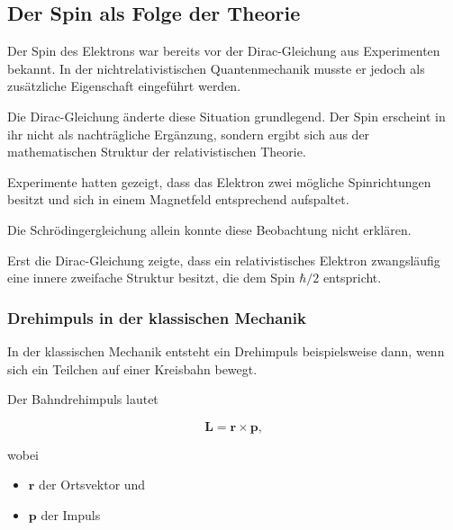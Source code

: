 
\subsection{Der Spin als Folge der Theorie}
\label{subsec:spin_als_folge_der_theorie}

Der Spin des Elektrons war
bereits vor der Dirac-Gleichung aus Experimenten bekannt. In der
nichtrelativistischen Quantenmechanik musste er jedoch als zusätzliche
Eigenschaft eingeführt werden.

Die Dirac-Gleichung änderte diese Situation grundlegend. Der Spin
erscheint in ihr nicht als nachträgliche Ergänzung, sondern ergibt sich
aus der mathematischen Struktur der relativistischen Theorie.

\begin{HistoryBox}
	\label{box:spin_vom_experiment_zur_theorie}
	
	Experimente hatten gezeigt, dass das Elektron zwei mögliche
	Spinrichtungen besitzt und sich in einem Magnetfeld entsprechend
	aufspaltet.
	
	Die Schrödingergleichung allein konnte diese Beobachtung nicht
	erklären.
	
	Erst die Dirac-Gleichung zeigte, dass ein relativistisches Elektron
	zwangsläufig eine innere zweifache Struktur besitzt, die dem Spin
	\(\hbar/2\) entspricht.
\end{HistoryBox}

\subsubsection*{Drehimpuls in der klassischen Mechanik}

In der klassischen Mechanik entsteht ein Drehimpuls%
 beispielsweise dann, wenn sich ein
Teilchen auf einer Kreisbahn bewegt.

Der Bahndrehimpuls lautet

\begin{equation}
	\mathbf{L}
	=
	\mathbf{r}
	\times
	\mathbf{p},
	\label{eq:bahndrehimpuls_spin_dirac}
\end{equation}

wobei

\begin{itemize}
	\item \(\mathbf{r}\) der Ortsvektor und
	\item \(\mathbf{p}\) der Impuls
\end{itemize}

